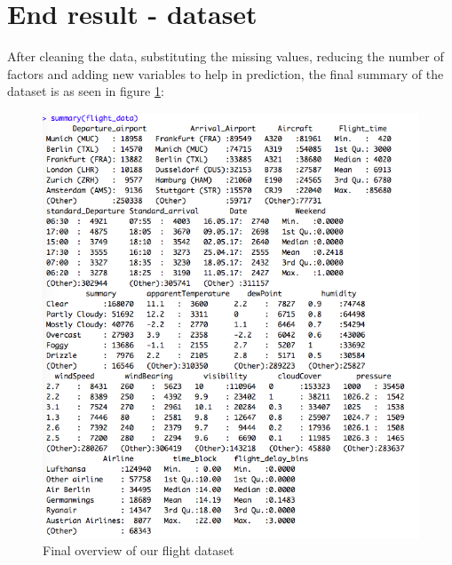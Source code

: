 \section{End result - dataset}

After cleaning the data, substituting the missing values, reducing the number of factors and adding new variables to help in prediction, the final summary of the dataset is as seen in figure \ref{fig:summary_flights}:

\begin{figure}[ht]
    \centering
    \includegraphics[width=\textwidth]{Figures/summary_flight_data.png}
    \caption{Final overview of our flight dataset}
    \label{fig:summary_flights}
\end{figure}